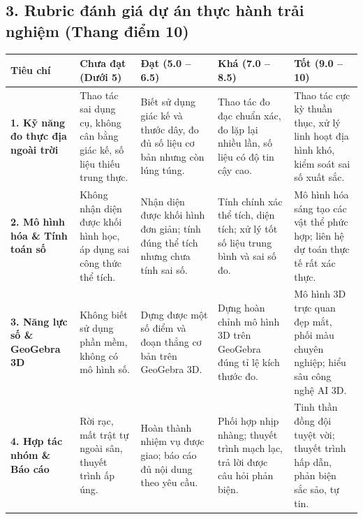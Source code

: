 \documentclass[12pt, a4paper]{article}
\begin{document}
\vspace{5pt}

\subsection*{3. Rubric đánh giá dự án thực hành trải nghiệm (Thang điểm 10)}

\begin{center}
\begin{tabularx}{\textwidth}{|p{3cm}|X|X|X|X|}
\hline
\textbf{Tiêu chí} & \textbf{Chưa đạt (Dưới 5)} & \textbf{Đạt (5.0 -- 6.5)} & \textbf{Khá (7.0 -- 8.5)} & \textbf{Tốt (9.0 -- 10)} \\
\hline
\textbf{1. Kỹ năng đo thực địa ngoài trời} & Thao tác sai dụng cụ, không cân bằng giác kế, số liệu thiếu trung thực. & Biết sử dụng giác kế và thước dây, đo đủ số liệu cơ bản nhưng còn lúng túng. & Thao tác đo đạc chuẩn xác, đo lặp lại nhiều lần, số liệu có độ tin cậy cao. & Thao tác cực kỳ thuần thục, xử lý linh hoạt địa hình khó, kiểm soát sai số xuất sắc. \\
\hline
\textbf{2. Mô hình hóa \& Tính toán số} & Không nhận diện được khối hình học, áp dụng sai công thức thể tích. & Nhận diện được khối hình đơn giản; tính đúng thể tích nhưng chưa tính sai số. & Tính chính xác thể tích, diện tích; xử lý tốt số liệu trung bình và sai số đo. & Mô hình hóa sáng tạo các vật thể phức hợp; liên hệ dự toán thực tế rất xác thực. \\
\hline
\textbf{3. Năng lực số \& GeoGebra 3D} & Không biết sử dụng phần mềm, không có mô hình số. & Dựng được một số điểm và đoạn thẳng cơ bản trên GeoGebra 3D. & Dựng hoàn chỉnh mô hình 3D trên GeoGebra đúng tỉ lệ kích thước đo. & Mô hình 3D trực quan đẹp mắt, phối màu chuyên nghiệp; hiểu sâu công nghệ AI 3D. \\
\hline
\textbf{4. Hợp tác nhóm \& Báo cáo} & Rời rạc, mất trật tự ngoài sân, thuyết trình ấp úng. & Hoàn thành nhiệm vụ được giao; báo cáo đủ nội dung theo yêu cầu. & Phối hợp nhịp nhàng; thuyết trình mạch lạc, trả lời được câu hỏi phản biện. & Tinh thần đồng đội tuyệt vời; thuyết trình hấp dẫn, phản biện sắc sảo, tự tin. \\
\hline
\end{tabularx}
\end{center}
\end{document}
